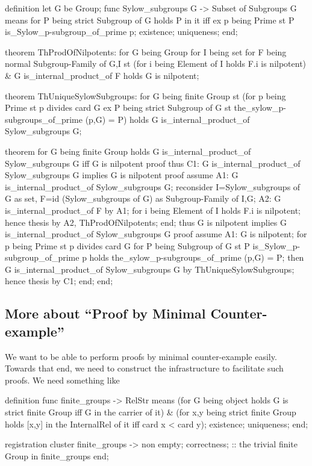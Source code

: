\begin{mizar}
definition
  let G be Group;
  func Sylow_subgroups G -> Subset of Subgroups G means
  for P being strict Subgroup of G
  holds P in it
        iff ex p being Prime
            st P is_Sylow_p-subgroup_of_prime p;
  existence;
  uniqueness;
end;

theorem ThProdOfNilpotents:
  for G being Group
  for I being set
  for F being normal Subgroup-Family of G,I
  st (for i being Element of I holds F.i is nilpotent)
   & G is_internal_product_of F
  holds G is nilpotent;

theorem ThUniqueSylowSubgroups:
  for G being finite Group
  st (for p being Prime st p divides card G
      ex P being strict Subgroup of G
      st the_sylow_p-subgroups_of_prime (p,G) = {P})
  holds G is_internal_product_of Sylow_subgroups G;
  
theorem
  for G being finite Group
  holds G is_internal_product_of Sylow_subgroups G
        iff G is nilpotent
proof
  thus C1: G is_internal_product_of Sylow_subgroups G
           implies G is nilpotent
  proof
    assume A1: G is_internal_product_of Sylow_subgroups G;
    reconsider I=Sylow_subgroups of G as set,
    F=id (Sylow_subgroups of G) as Subgroup-Family of I,G;
    A2: G is_internal_product_of F by A1;
    for i being Element of I holds F.i is nilpotent;
    hence thesis by A2, ThProdOfNilpotents;
  end;
  thus G is nilpotent
       implies G is_internal_product_of Sylow_subgroups G
  proof
    assume A1: G is nilpotent;
    for p being Prime st p divides card G
    for P being Subgroup of G
    st P is_Sylow_p-subgroup_of_prime p
    holds the_sylow_p-subgroups_of_prime (p,G) = {P};
    then G is_internal_product_of Sylow_subgroups G
    by ThUniqueSylowSubgroups;
    hence thesis by C1;
  end;
end;
\end{mizar}

\subsection{More about ``Proof by Minimal Counter-example''}
We want to be able to perform proofs by minimal counter-example
easily. Towards that end, we need to construct the infrastructure to
facilitate such proofs. We need something like

\begin{mizar}
definition
  func finite_groups -> RelStr means
  (for G being object
   holds G is strict finite Group
         iff G in the carrier of it)
  & (for x,y being strict finite Group
     holds [x,y] in the InternalRel of it
           iff card x < card y);
  existence;
  uniqueness;
end;

registration
  cluster finite_groups -> non empty;
  correctness; :: the trivial finite Group in finite_groups
end;
\end{mizar}

